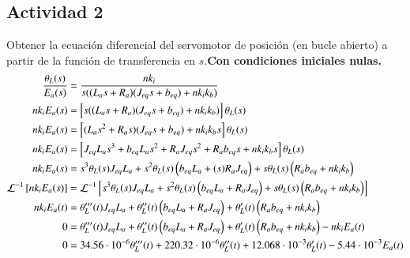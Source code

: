 \subsection{Actividad 2}
Obtener la ecuación diferencial del servomotor de posición (en bucle
abierto) a partir de la función de transferencia en $s$.\textbf{Con condiciones iniciales nulas.}
  \vspace{-0.05in}
  \begin{equation}
    \begin{split}
      \dfrac{\theta_L(s)}{E_a(s)} &= \dfrac{nk_i}{s((L_as+R_a)(J_{eq}s+b_{eq})+nk_ik_b)}\\
      nk_iE_a(s) & = \left[s((L_as+R_a)(J_{eq}s+b_{eq})+nk_ik_b)\right]\theta_L(s)\\
      nk_iE_a(s) & = \left[(L_as^2+R_as)(J_{eq}s+b_{eq})+nk_ik_bs\right]\theta_L(s)\\
      nk_iE_a(s) & = \left[J_{eq}L_as^3+b_{eq}L_as^2+R_aJ_{eq}s^2+R_ab_{eq}s+nk_ik_bs\right]\theta_L(s)\\
      nk_iE_a(s) & = s^3\theta_L(s)J_{eq}L_a+s^2\theta_L(s)\left(b_{eq}L_a+(s)R_aJ_{eq}\right)+s\theta_L(s)\left(R_ab_{eq}+nk_ik_b\right)\\
      \mathcal{L}^{-1}\left[ nk_iE_a(s)\right] & = \mathcal{L}^{-1}\left[s^3\theta_L(s)J_{eq}L_a+s^2\theta_L(s)\left(b_{eq}L_a+R_aJ_{eq}\right)+s\theta_L(s)\left(R_ab_{eq}+nk_ik_b\right)\right]\\
       nk_iE_a(t) & = \theta_L'''(t)J_{eq}L_a+\theta_L''(t)\left(b_{eq}L_a+R_aJ_{eq}\right)+\theta_L'(t)\left(R_ab_{eq}+nk_ik_b\right)\\
0 & =
\theta_L'''(t)J_{eq}L_a+\theta_L''(t)\left(b_{eq}L_a+R_aJ_{eq}\right)+\theta_L'(t)\left(R_ab_{eq}+nk_ik_b\right)-nk_iE_a(t)\\
0 & = 34.56 \cdot 10^{-6}\theta_L'''(t)+220.32 \cdot 10^{-6}\theta_L''(t)+12.068 \cdot 10^{-3}\theta_L'(t)-5.44 \cdot 10^{-3}E_a(t)\\
\end{split}
\end{equation}

